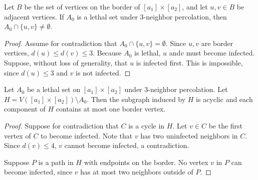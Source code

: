 \begin{prop}
\label{prop:border}
Let $B$ be the set of vertices on the border of $[a_1] \times [a_2]$, and let $u,v \in B$ be adjacent vertices. If $A_0$ is a lethal set under 3-neighbor percolation, then $A_0 \cap \{u,v\} \neq \emptyset$.
\end{prop}

\begin{proof}
Assume for contradiction that $A_0 \cap \{u,v\} = \emptyset$. Since $u,v$ are border vertices, $d(u) \leq d(v) \leq 3$. Because $A_0$ is lethal, $u$ and$v$ must become infected. Suppose, without loss of generality, that $u$ is infected first. This is impossible, since $d(u) \leq 3$ and $v$ is not infected.
\end{proof}

\begin{prop}
\label{prop:immune_regions}
Let $A_0$ be a lethal set on $[a_1] \times [a_2]$ under 3-neighbor percolation. Let $H = V([a_1] \times [a_2]) \setminus A_0$. Then the subgraph induced by $H$ is acyclic and each component of $H$ contains at most one border vertex.
\end{prop}

\begin{proof}
Suppose for contradiction that $C$ is a cycle in $H$. Let $v \in C$ be the first vertex of $C$ to become infected. Note that $v$ has two uninfected neighbors in $C$. Since $d(v) \leq 4$, $v$ cannot become infected, a contradiction.

Suppose $P$ is a path in $H$ with endpoints on the border. No vertex $v$ in $P$ can become infected, since $v$ has at most two neighbors outside of $P$.
\end{proof}

